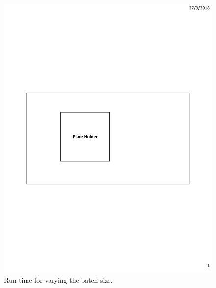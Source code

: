 \begin{figure}[h]
\begin{minipage}{0.18\linewidth}
		\includegraphics[width=\linewidth]{fig/PlaceHolder.pdf}
		\centerline{\dsrandom}
	\end{minipage}
	\caption{Run time for varying the batch size.}
	\label{fig:vary-batch-size}
\end{figure}
